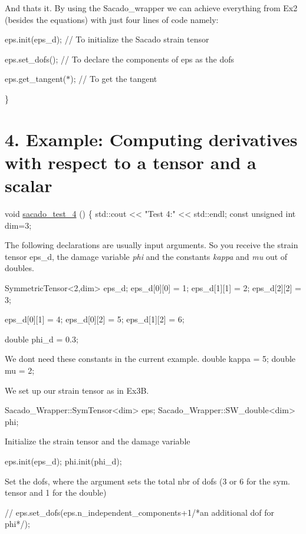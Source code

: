 And that\textquotesingle{}s it. By using the Sacado\+\_\+wrapper we can achieve everything from Ex2 (besides the equations) with just four lines of code namely\+:
\begin{DoxyItemize}
\item eps.\+init(eps\+\_\+d); // To initialize the Sacado strain tensor
\item eps.\+set\+\_\+dofs(); // To declare the components of eps as the dofs
\item eps.\+get\+\_\+tangent($\ast$); // To get the tangent 
\begin{DoxyCode}
\}
\end{DoxyCode}
 
\end{DoxyItemize}\hypertarget{index_Ex4}{}\section{4. Example\+: Computing derivatives with respect to a tensor and a scalar}\label{index_Ex4}

\begin{DoxyCode}
\textcolor{keywordtype}{void} \hyperlink{example__code__to__be__documented_8cc_a2f4def4563e31d720e07bc7d6363ebe2}{sacado\_test\_4} ()
\{
    std::cout << \textcolor{stringliteral}{"Test 4:"} << std::endl;
    \textcolor{keyword}{const} \textcolor{keywordtype}{unsigned} \textcolor{keywordtype}{int} dim=3;
\end{DoxyCode}
 The following declarations are usually input arguments. So you receive the strain tensor  eps\+\_\+d, the damage variable {\itshape phi} and the constants {\itshape kappa} and {\itshape mu} out of doubles. 
\begin{DoxyCode}
SymmetricTensor<2,dim> eps\_d;
eps\_d[0][0] = 1;
eps\_d[1][1] = 2;
eps\_d[2][2] = 3;

eps\_d[0][1] = 4;
eps\_d[0][2] = 5;
eps\_d[1][2] = 6;

\textcolor{keywordtype}{double} phi\_d = 0.3;
\end{DoxyCode}
 We don\textquotesingle{}t need these constants in the current example. double kappa = 5; double mu = 2;

We set up our strain tensor as in Ex3B. 
\begin{DoxyCode}
Sacado\_Wrapper::SymTensor<dim> eps;
Sacado\_Wrapper::SW\_double<dim> phi;
\end{DoxyCode}
 Initialize the strain tensor and the damage variable 
\begin{DoxyCode}
eps.init(eps\_d);
phi.init(phi\_d);
\end{DoxyCode}
 Set the dofs, where the argument sets the total nbr of dofs (3 or 6 for the sym. tensor and 1 for the double) 
\begin{DoxyCode}
\textcolor{comment}{//    eps.set\_dofs(eps.n\_independent\_components+1/*an additional dof for phi*/);}
\end{DoxyCode}


